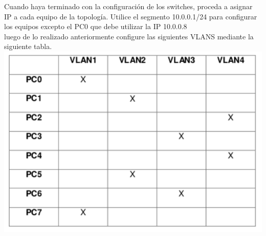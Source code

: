 \documentclass{article}
\begin{document}
Cuando haya terminado con la configuración de los switches, proceda a asignar IP a cada equipo de la
topología. Utilice el segmento 10.0.0.1/24 para configurar los equipos excepto el PC0 que debe utilizar
la IP 10.0.0.8\\

luego de lo realizado anteriormente configure las siguientes VLANS mediante la siguiente tabla.\\

\includegraphics[scale=0.8]{tabla.png}\\
\end{document}
